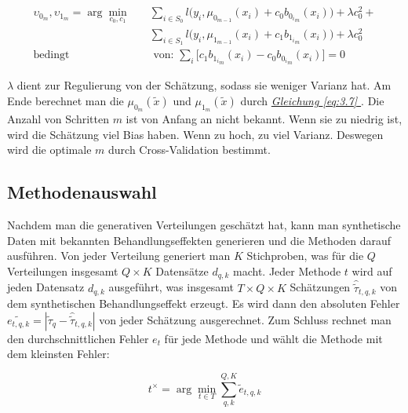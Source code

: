 \documentclass[12pt,a4paper,twoside]{scrartcl}
\numberwithin{equation}{section}
\renewcommand*{\refeq}[1]{\emph{\hyperref[#1]{Gleichung \ref*{#1} }}}
\begin{document}
\begin{equation}\label{eq:3.11}
\begin{split}
	\upsilon_{0_m},\upsilon_{1_m} = \arg\min_{c_0,c_1} \quad &\sum_{i \in S_0} l \big (y_i,\mu_{0_{m-1}}(x_i) + c_0  b_{{0_i}_m}(x_i) \big ) + \lambda c_0^2 + \\
 &\sum_{i \in S_1} l \big (y_i,\mu_{1_{m-1}}(x_i) + c_1  b_{{1_i}_m}(x_i) \big ) + \lambda c_0^2\\
  \text{bedingt}& \text{ von: } \sum_i \big [c_1 b_{{1_i}_m}(x_i) - c_0 b_{{0_i}_m}(x_i) \big ] = 0
\end{split}
\end{equation}
  	
\noindent
 $\lambda$ dient zur Regulierung von der Schätzung, sodass sie weniger Varianz hat. Am Ende berechnet man die $\mu_{0_m}(\tilde{x})$ und $\mu_{1_m}(\tilde{x})$ durch \refeq{eq:3.7}. Die Anzahl von Schritten $m$ ist von Anfang an nicht bekannt. Wenn sie zu niedrig ist, wird die Schätzung viel Bias haben. Wenn zu hoch, zu viel Varianz. Deswegen wird die optimale $m$ durch Cross-Validation bestimmt\cite{schuler2017synth}.\par
    	
\subsection{Methodenauswahl}\label{subsec:methodenauswahl}

Nachdem man die generativen Verteilungen geschätzt hat, kann man synthetische Daten mit bekannten Behandlungseffekten generieren und die Methoden darauf ausführen. Von jeder Verteilung generiert man $K$ Stichproben, was für die $Q$ Verteilungen  insgesamt $Q \times K$ Datensätze $d_{q,k}$ macht. Jeder Methode $t$ wird auf jeden Datensatz $d_{q,k}$ ausgeführt, was insgesamt  $T \times Q \times K$ Schätzungen $\hat{\tilde{\tau}}_{t,q,k}$ von dem synthetischen Behandlungseffekt erzeugt. Es wird dann den absoluten Fehler $\tilde{e_{t,q,k}} = |\tilde{\tau}_q - \hat{\tilde{\tau}}_{t,q,k}|$ von jeder Schätzung  ausgerechnet. Zum Schluss rechnet man den durchschnittlichen Fehler $e_t$ für jede Methode und wählt die Methode mit dem kleinsten Fehler\cite{schuler2017synth}:\par

\begin{equation}\label{eq:3.12}
 t^{\times} = \arg\min_{t \in T} \sum_{q,k}^{Q,K} \tilde{e}_{t,q,k}
\end{equation}
\clearpage
\end{document}
